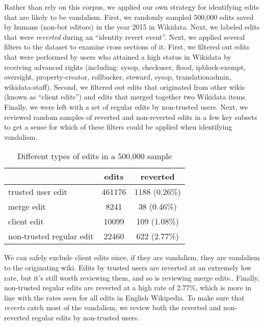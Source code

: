 \documentclass{sig-alternate}
\begin{document}
Rather than rely on this corpus, we applied our own strategy for identifying edits that are likely to be vandalism. First, we randomly sampled 500,000 edits saved by humans (non-bot editors) in the year 2015 in Wikidata. Next, we labeled edits that were \textit{reverted} during an ``identity revert event''. Next, we applied several filters to the dataset to examine cross sections of it. First, we filtered out edits that were performed by users who attained a high status in Wikidata by receiving advanced rights (including: sysop, checkuser, flood, ipblock-exempt, oversight, property-creator, rollbacker, steward, sysop, translationadmin, wikidata-staff).  Second, we filtered out edits that originated from other wikis (known as ``client edits'') and edits that merged together two Wikidata items. Finally, we were left with a set of regular edits by non-trusted users.  Next, we reviewed random samples of reverted and non-reverted edits in a few key subsets to get a sense for which of these filters could be applied when identifying vandalism.

\begin{table}
\centering
\caption{Different types of edits in a 500,000 sample}
\begin{tabular}{l|c|c} \hline
& edits & reverted \\ \hline
trusted user edit & 461176 & 1188 (0.26\%)\\ \hline
merge edit & 8241 & 38 (0.46\%) \\ \hline
client edit & 10099 & 109 (1.08\%) \\ \hline
non-trusted regular edit & 22460 & 622 (2.77\%)
\end{tabular}
\end{table}

We can safely exclude client edits since, if they are vandalism, they are vandalism to the originating wiki. Edits by trusted users are reverted at an extremely low rate, but it's still worth reviewing them, and so is reviewing merge edits.. Finally, non-trusted regular edits are reverted at a high rate of 2.77\%, which is more in line with the rates seen for all edits in English Wikipedia\cite{potthast:crowdsourcing}.  To make sure that \textit{reverts} catch most of the vandalism, we review both the reverted and non-reverted regular edits by non-trusted users.
\end{document}
